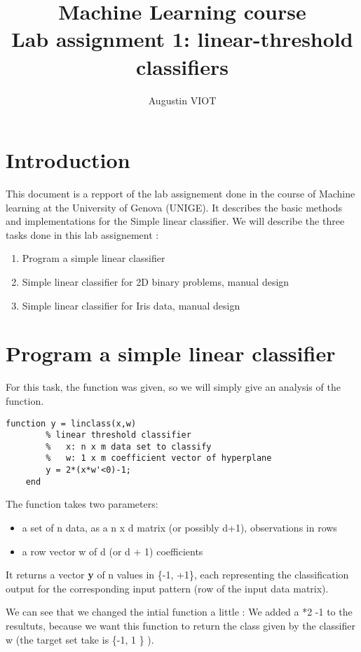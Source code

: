 \documentclass[a4paper]{article}
\title{Machine Learning course\\
	\large Lab assignment 1: linear-threshold classifiers}
\author{Augustin VIOT\\
}
\begin{document}
	\maketitle
	
	\tableofcontents
	
	
	\section{Introduction}
	
		This document is a repport of the lab assignement done in the course of Machine learning at the University of Genova (UNIGE). It describes the basic methods and implementations for the Simple linear classifier. We will describe the three tasks done in this lab assignement : 
	\begin{enumerate}
		\item Program a simple linear classifier
		\item Simple linear classifier for 2D binary problems, manual design
		\item Simple linear classifier for Iris data, manual design
	\end{enumerate}
	

	\pagebreak
	\section{Program a simple linear classifier}
	For this task, the function was given, so we will simply give an analysis of the function.
	\begin{lstlisting}[frame=single]
	function y = linclass(x,w)
		% linear threshold classifier
		%   x: n x m data set to classify
		%   w: 1 x m coefficient vector of hyperplane
		y = 2*(x*w'<0)-1;
	end
	\end{lstlisting}
	The function takes two parameters:
	\begin{itemize}
		\item a set of n data, as a n x d matrix (or possibly d+1), observations in rows
		\item a row vector w of d (or d + 1) coefficients
	\end{itemize}

	It returns a vector \textbf y of n values in \{-1, +1\}, each representing the classification output for the corresponding input pattern (row of the input data matrix).
	
	
	We can see that we changed the intial function a little : We added a *2 -1 to the resultuts, because we want this function to return
	the class given by the classifier w (the target set take is \{-1, 1 \} ).
	
\end{document}
